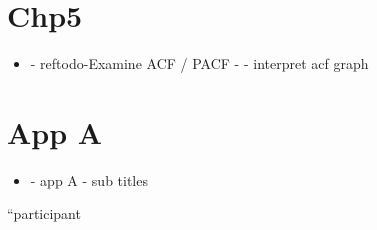 \section{Chp5}
\begin{itemize}
\item - ref{todo-Examine ACF / PACF} - - interpret acf graph
\end{itemize}

\section{App A}
\begin{itemize}
\item - app A - sub titles
\end{itemize}


\textquotedblleft participant